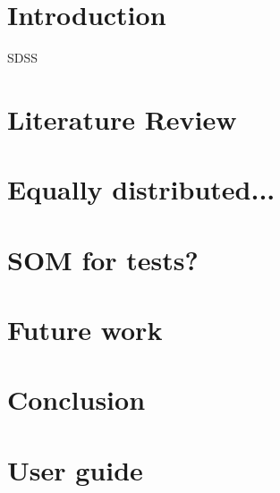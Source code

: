 \documentclass[12pt]{book}
\begin{document}
\mainmatter

\chapter{Introduction}
%

\gls{SDSS}

\chapter{Literature Review}


\chapter{Equally distributed...}

\chapter{SOM for tests?}

\chapter{Future work}


\chapter{Conclusion}


\appendix

\chapter{User guide}


\backmatter

\begin{refsection}
\nocite{Alvarez2019}

\printbibliography[heading=bibintoc,title={List of Publications}]
\end{refsection}
\end{document}
